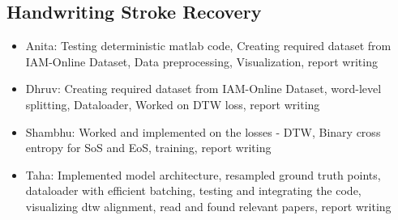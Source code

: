 \documentclass[10pt,twocolumn,letterpaper]{article}
\begin{document}
\subsection{Handwriting Stroke Recovery}
\begin{itemize}
    \item Anita: Testing deterministic matlab code, Creating required dataset from IAM-Online Dataset, Data preprocessing, Visualization, report writing
    \item Dhruv: Creating required dataset from IAM-Online Dataset, word-level splitting, Dataloader, Worked on DTW loss, report writing
    \item Shambhu: Worked and implemented on the losses - DTW, Binary cross entropy for SoS and EoS, training, report writing
    \item Taha: Implemented model architecture, resampled ground truth points, dataloader with efficient batching, testing and integrating the code, visualizing dtw alignment, read and found relevant papers, report writing
\end{itemize}


{\small


}
\end{document}
